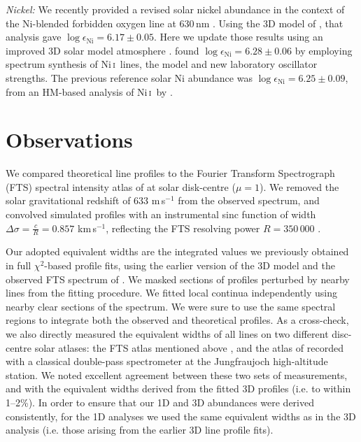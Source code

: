 \documentclass[traditabstract]{aa}
\newcommand{\altnii}{Ni\,\textsc{i}}
\newcommand{\nii}{\altnii\ }
\begin{document}
\textit{Nickel:} We recently provided a revised solar nickel abundance in the context of the Ni-blended forbidden
oxygen line at 630\,nm \citep{Scott09Ni}.  Using the 3D model of \citet{AspI}, that analysis gave
$\log \epsilon_\mathrm{Ni}=6.17\pm0.05$.  Here we update those results using an improved 3D solar model atmosphere .  \citet{Wood14} found $\log \epsilon_\mathrm{Ni}=6.28\pm0.06$ by employing spectrum synthesis of \nii lines, the  model and new laboratory oscillator strengths.  The previous reference solar Ni abundance \citep{GS98, AGS05, Grevesse07} was $\log \epsilon_\mathrm{Ni}=6.25\pm0.09$, from an HM-based analysis of \nii by \citet{Biemont80}.


\section{Observations}
\label{observations}

We compared theoretical line profiles to the Fourier Transform Spectrograph (FTS) spectral intensity atlas of
\citet[][see also \citealt{Neckel99}]{Brault87} at solar disk-centre ($\mu=1$).
We removed the solar gravitational redshift of 633 m\,s$^{-1}$ from the observed spectrum, and convolved simulated
profiles with an instrumental sinc function of width $\Delta\sigma = \frac{c}{R}= 0.857$ km\,s$^{-1}$, reflecting
the FTS resolving power $R=350\,000$ \citep{Neckel99}.

Our adopted equivalent widths are the integrated values we previously obtained in full $\chi^2$-based profile fits, using the earlier version of the 3D model \citep{AspI} and the observed FTS spectrum of \citet{Brault87}.  We masked sections of profiles perturbed by nearby lines
from the fitting procedure.  We fitted local continua independently using nearby clear sections of the spectrum.  We were sure to use the same spectral regions to integrate both the observed and theoretical profiles. As a cross-check, we also directly measured the equivalent widths of all lines on two different disc-centre solar atlases: the FTS atlas mentioned
above \citep{Brault87}, and the atlas of \citet{LiegeAtlas} recorded with a classical double-pass spectrometer at the Jungfraujoch high-altitude station.  We noted excellent agreement between these two sets of measurements, and with the equivalent widths derived from the fitted 3D profiles (i.e. to within 1--2\%).  In order to ensure that our 1D and 3D abundances were derived consistently, for the 1D analyses we used the same equivalent widths as in the 3D analysis (i.e. those arising from the earlier 3D line profile fits).
\end{document}
